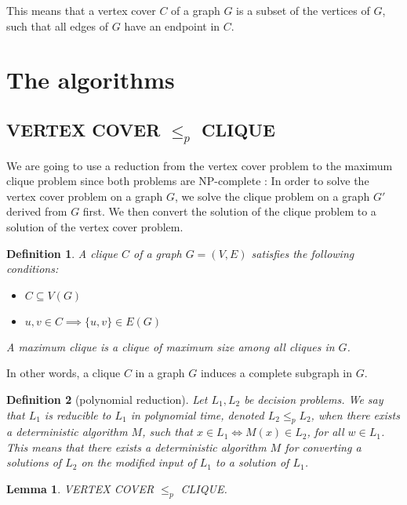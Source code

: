 \documentclass[11pt,a4paper]{article}
\newtheorem*{definition}{Definition}
\newtheorem*{lemma}{Lemma}
\begin{document}
This means that a vertex cover $C$ of a graph $G$ is a subset of the vertices of $G$, such that all edges of $G$ have an endpoint in $C$. \\


\section{The algorithms}

\subsection{VERTEX COVER $\leq_{p}$ CLIQUE}

We are going to use a reduction from the vertex cover problem to the maximum clique problem since both problems are NP-complete \cite{Patric}:
In order to solve the vertex cover problem on a graph $G$, we solve the clique problem on a graph $G'$ derived from $G$ first. We then convert the solution of the clique problem to a solution of the vertex cover problem.  

\begin{definition}
A \emph{clique} $C$ of a graph $G=(V,E)$ satisfies the following conditions:

\begin{itemize}
\item $C \subseteq V(G)$
\item $u, v \in C \implies \{u, v\} \in E(G)$
\end{itemize}

A \emph{maximum clique} is a clique of maximum size among all cliques in $G$.
\end{definition}

In other words, a clique $C$ in a graph $G$ induces a complete subgraph in $G$. \\

\begin{definition}[polynomial reduction]
Let $L_{1}, L_{2}$ be decision problems. We say that $L_{1}$ is reducible to $L_{1}$ in polynomial time, denoted $L_{2} \leq_{p} L_{2}$, when there exists a deterministic algorithm $M$, such that $x \in L_{1} \iff M(x) \in L_{2}$, for all $w \in L_{1}$. \\

This means that there exists a deterministic algorithm $M$ for converting a solutions of $L_{2}$ on the modified input of $L_{1}$ to a solution of $L_{1}$. 
\end{definition}

\begin{lemma}
VERTEX COVER $\leq_{p}$ CLIQUE.
\end{lemma}
\end{document}
